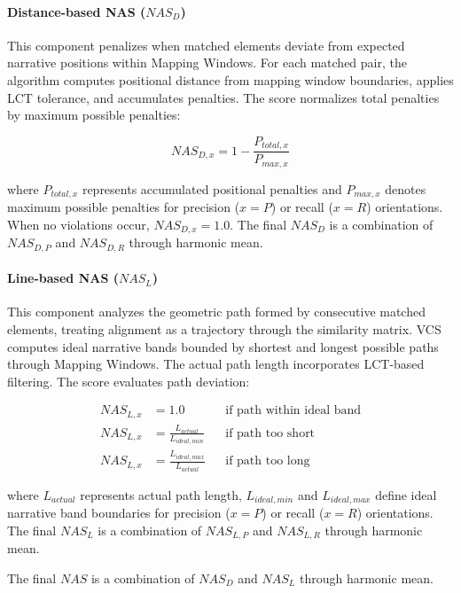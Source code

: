 \documentclass[letterpaper]{article} %
\begin{document}
\paragraph{Distance-based NAS ($NAS_D$)}
This component penalizes when matched elements deviate from expected narrative positions within Mapping Windows. For each matched pair, the algorithm computes positional distance from mapping window boundaries, applies LCT tolerance, and accumulates penalties. The score normalizes total penalties by maximum possible penalties:

\begin{equation} \label{eq:nas_dx_revised}
NAS_{D,x} = 1 - \frac{P_{total,x}}{P_{max,x}}
\end{equation}

where $P_{total,x}$ represents accumulated positional penalties and $P_{max,x}$ denotes maximum possible penalties for precision ($x=P$) or recall ($x=R$) orientations. When no violations occur, $NAS_{D,x} = 1.0$. The final $NAS_D$ is a combination of $NAS_{D,P}$ and $NAS_{D,R}$ through harmonic mean.

\paragraph{Line-based NAS ($NAS_L$)}
This component analyzes the geometric path formed by consecutive matched elements, treating alignment as a trajectory through the similarity matrix. VCS computes ideal narrative bands bounded by shortest and longest possible paths through Mapping Windows. The actual path length incorporates LCT-based filtering. The score evaluates path deviation:

\begin{align}
NAS_{L,x} &= 1.0 && \text{if path within ideal band} \label{eq:nas_lx_ideal} \\
NAS_{L,x} &= \frac{L_{actual}}{L_{ideal,min}} && \text{if path too short} \label{eq:nas_lx_short} \\
NAS_{L,x} &= \frac{L_{ideal,max}}{L_{actual}} && \text{if path too long} \label{eq:nas_lx_long}
\end{align}

where $L_{actual}$ represents actual path length, $L_{ideal,min}$ and $L_{ideal,max}$ define ideal narrative band boundaries for precision ($x=P$) or recall ($x=R$) orientations. The final $NAS_L$ is a combination of $NAS_{L,P}$ and $NAS_{L,R}$ through harmonic mean.

The final $NAS$ is a combination of $NAS_D$ and $NAS_L$ through harmonic mean.
\end{document}
